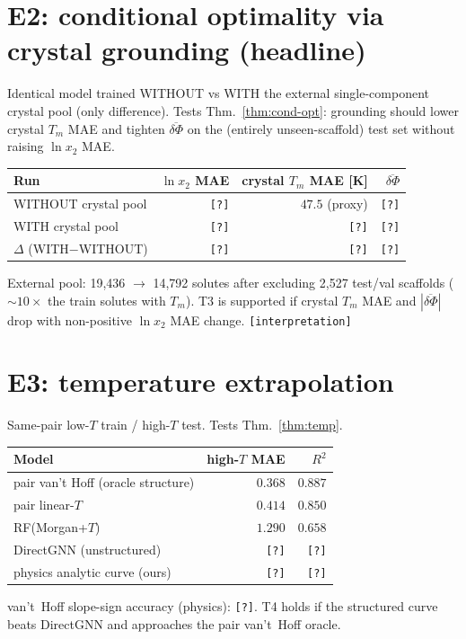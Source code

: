 \documentclass[11pt]{article}
\newcommand{\pending}[1][?]{{\color{red}\texttt{[#1]}}}
\newcommand{\lnx}{\ln x_2}
\newcommand{\Phicry}{\Phi}
\newcommand{\Tm}{T_m}
\begin{document}
\section{E2: conditional optimality via crystal grounding (headline)}
\label{sec:e2}
Identical model trained WITHOUT vs WITH the external single-component crystal
pool (only difference). Tests Thm.~\ref{thm:cond-opt}: grounding should lower
crystal $\Tm$ MAE and tighten $\overline{\delta\Phicry}$ on the (entirely
unseen-scaffold) test set without raising $\lnx$ MAE.
\begin{center}
\begin{tabular}{lrrr}
\toprule
Run & $\lnx$ MAE & crystal $\Tm$ MAE [K] & $\overline{\delta\Phicry}$ \\
\midrule
WITHOUT crystal pool & \pending & $47.5$ (proxy) & \pending \\
WITH crystal pool    & \pending & \pending & \pending \\
\midrule
$\Delta$ (WITH$-$WITHOUT) & \pending & \pending & \pending \\
\bottomrule
\end{tabular}
\end{center}
External pool: 19{,}436 $\to$ 14{,}792 solutes after excluding 2{,}527 test/val
scaffolds ($\sim10\times$ the train solutes with $\Tm$).
T3 is supported if crystal $\Tm$ MAE and $|\overline{\delta\Phicry}|$ drop with
non-positive $\lnx$ MAE change. \pending[interpretation]

\section{E3: temperature extrapolation}
\label{sec:e3}
Same-pair low-$T$ train / high-$T$ test. Tests Thm.~\ref{thm:temp}.
\begin{center}
\begin{tabular}{lrr}
\toprule
Model & high-$T$ MAE & $R^2$ \\
\midrule
pair van't Hoff (oracle structure) & $0.368$ & $0.887$ \\
pair linear-$T$ & $0.414$ & $0.850$ \\
RF(Morgan+$T$) & $1.290$ & $0.658$ \\
DirectGNN (unstructured) & \pending & \pending \\
physics analytic curve (ours) & \pending & \pending \\
\bottomrule
\end{tabular}
\end{center}
van't~Hoff slope-sign accuracy (physics): \pending. T4 holds if the structured
curve beats DirectGNN and approaches the pair van't~Hoff oracle.
\end{document}
